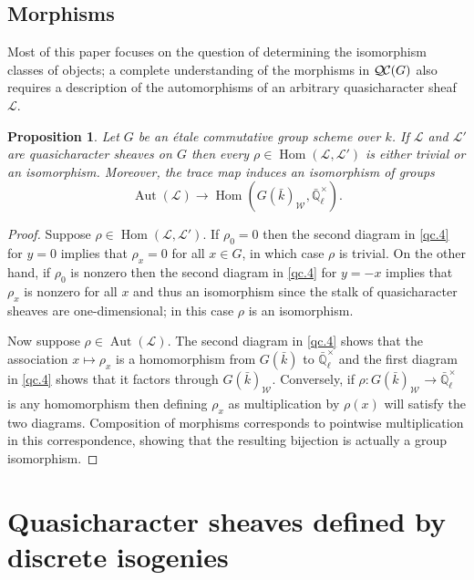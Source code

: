 \documentclass{amsart}
\theoremstyle{plain}
\newtheorem{proposition}[theorem]{Proposition}
\theoremstyle{definition}
\theoremstyle{remark}
\newcommand{\EE}{\mathbb{\bar Q}_\ell}
\newcommand{\bFq}{\bar{k}}
\newcommand{\Fq}{k}
\newcommand{\EEx}{\EE^\times}
\newcommand{\Weil}[1]{\mathcal{W}_{#1}}
\DeclareMathOperator{\Aut}{Aut}
\DeclareMathOperator{\Hom}{Hom}
\newcommand{\qcs}[1]{{\mathcal{#1}}}
\newcommand{\QC}{{\mathcal{Q\hskip-0.8pt C}}}
\begin{document}
\subsection{Morphisms}\label{ssec:mor-etale}

Most of this paper focuses on the question of determining the isomorphism classes of objects; a complete understanding of the morphisms in $\QC(G)$ also requires a description of the automorphisms of an arbitrary quasicharacter sheaf $\qcs{L}$.

\begin{proposition}\label{prop:autornaught_etale}
Let $G$ be an étale commutative group scheme over $\Fq$.
If $\qcs{L}$ and $\qcs{L}'$ are quasicharacter sheaves on $G$ then
every $\rho\in \Hom(\qcs{L},\qcs{L}')$ is either trivial or an isomorphism. Moreover, the trace map induces an isomorphism of groups
\[
\Aut(\qcs{L}) \to \Hom(G(\bFq)_{\Weil{}}, \EEx).
\]
\end{proposition}

\begin{proof}
Suppose $\rho \in \Hom(\qcs{L},\qcs{L}')$.
If $\rho_0 = 0$ then the second diagram in \ref{qc.4} for $y=0$ implies that $\rho_x = 0$ for all $x\in G$, in which case $\rho$ is trivial.
On the other hand, if $\rho_0$ is nonzero then the second diagram in \ref{qc.4} for $y = -x$ implies that $\rho_x$ is nonzero for all $x$ and thus an isomorphism since the stalk of quasicharacter sheaves are one-dimensional; in this case $\rho$ is an isomorphism.

Now suppose $\rho \in \Aut(\qcs{L})$.
The second diagram in \ref{qc.4} shows that the association $x \mapsto \rho_x$ is a homomorphism from $G(\bFq)$ to $\EEx$ and the first diagram in \ref{qc.4} shows that it factors through $G(\bFq)_{\Weil{}}$.  Conversely, if $\rho : G(\bFq)_{\Weil{}} \to \EEx$ is any homomorphism then defining $\rho_x$ as multiplication by $\rho(x)$ will satisfy the two diagrams.  Composition of morphisms corresponds to pointwise multiplication in this correspondence, showing that the resulting bijection is actually a group isomorphism.
\end{proof}


\section{Quasicharacter sheaves defined by discrete isogenies} \label{sec:disc-isog}
\end{document}
